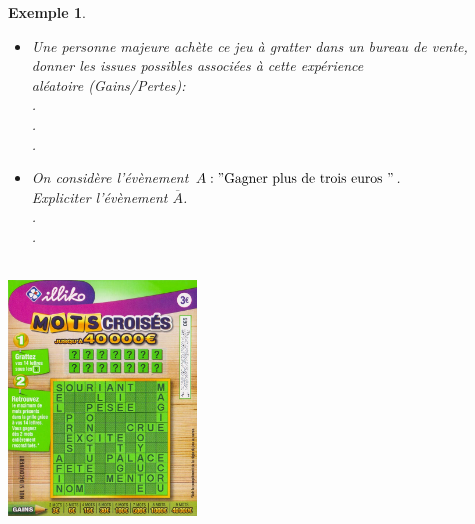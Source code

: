 \documentclass[a4paper,10.5pt]{article}
\newtheorem{ex}{Exemple}
\begin{document}
\begin{minipage}[c]{0.6\linewidth}
	\begin{ex}\hfill\\
		\begin{itemize}[$\square$]
		\item Une personne majeure achète ce jeu à gratter dans un bureau de vente, donner les issues possibles associées à cette expérience \\aléatoire (Gains/Pertes):\\[0.5cm]
		.\dotfill\\[0.5cm].\dotfill\\[0.5cm].
		\item On considère l'évènement $A : "\text{Gagner plus de trois euros}~"$.\\ Expliciter l'évènement $\overline{A}$.\\[0.5cm]
		.\dotfill\\[0.5cm].\dotfill\\[0.5cm]
		\end{itemize}
	\end{ex}
\end{minipage}
\hfill
\begin{minipage}[c]{0.3\linewidth}
	\quad\hfill\\
	\includegraphics[width=50mm,scale=0.2]{mots-croises-2021.jpg}
\end{minipage}
\end{document}

